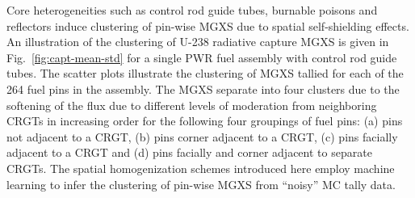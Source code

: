 \documentclass[12pt,twoside]{mitthesis-exec}
\begin{document}
Core heterogeneities such as control rod guide tubes, burnable poisons and reflectors induce clustering of pin-wise MGXS due to spatial self-shielding effects. An illustration of the clustering of U-238 radiative capture MGXS is given in Fig.~\ref{fig:capt-mean-std} for a single PWR fuel assembly with control rod guide tubes. The scatter plots illustrate the clustering of MGXS tallied for each of the 264 fuel pins in the assembly. The MGXS separate into four clusters due to the softening of the flux due to different levels of moderation from neighboring CRGTs in increasing order for the following four groupings of fuel pins: (a) pins not adjacent to a CRGT, (b) pins corner adjacent to a CRGT, (c) pins facially adjacent to a CRGT and (d) pins facially and corner adjacent to separate CRGTs. The spatial homogenization schemes introduced here employ machine learning to infer the clustering of pin-wise MGXS from ``noisy'' MC tally data.
\end{document}
